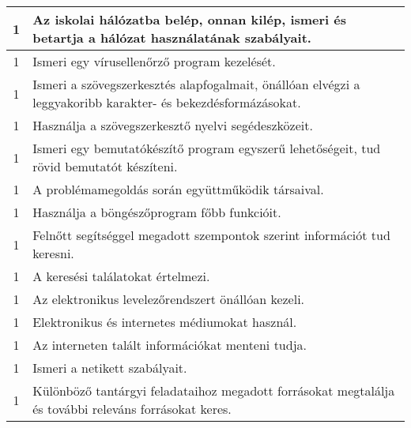 \begin{longtable}{c | p{12cm} }
                                          1 &  Az iskolai hálózatba belép, onnan kilép, ismeri és betartja a hálózat használatának szabályait. \\ \hline
                                          1 &  Ismeri egy vírusellenőrző program kezelését. \\ \hline
                                          1 &  Ismeri a szövegszerkesztés alapfogalmait, önállóan elvégzi a leggyakoribb karakter- és bekezdésformázásokat. \\ \hline
                                          1 &  Használja a szövegszerkesztő nyelvi segédeszközeit. \\ \hline
                                          1 &  Ismeri egy bemutatókészítő program egyszerű lehetőségeit, tud rövid bemutatót készíteni. \\ \hline
                                          1 &  A problémamegoldás során együttműködik társaival. \\ \hline
                                          1 &  Használja a böngészőprogram főbb funkcióit. \\ \hline
                                          1 &  Felnőtt segítséggel megadott szempontok szerint információt tud keresni. \\ \hline
                                          1 &  A keresési találatokat értelmezi. \\ \hline
                                          1 &  Az elektronikus levelezőrendszert önállóan kezeli. \\ \hline
                                          1 &  Elektronikus és internetes médiumokat használ. \\ \hline
                                          1 &  Az interneten talált információkat menteni tudja. \\ \hline
                                          1 &  Ismeri a netikett szabályait. \\ \hline
                                          1 &  Különböző tantárgyi feladataihoz megadott forrásokat megtalálja és további releváns forrásokat keres. \\ \hline
                                      

\end{longtable}
